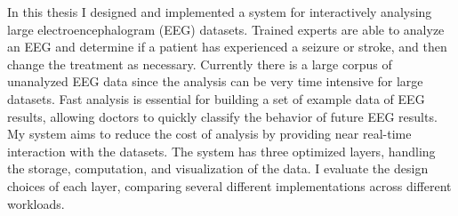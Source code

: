 % 
% 
%
In this thesis I designed and implemented a system for interactively analysing
large electroencephalogram (EEG) datasets. Trained experts are able to analyze
an EEG and determine if a patient has experienced a seizure or stroke, and then
change the treatment as necessary. Currently there is a large corpus of
unanalyzed EEG data since the analysis can be very time intensive for large
datasets. Fast analysis is essential for building a set of example data of EEG
results, allowing doctors to quickly classify the behavior of future EEG
results. My system aims to reduce the cost of analysis by providing near
real-time interaction with the datasets. The system has three optimized layers,
handling the storage, computation, and visualization of the data. I evaluate
the design choices of each layer, comparing several different implementations
across different workloads.
